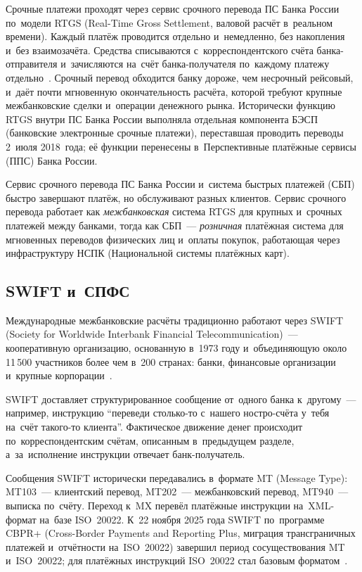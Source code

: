 Срочные платежи проходят через сервис срочного перевода ПС Банка России
по~модели RTGS (Real-Time Gross Settlement, валовой расчёт в~реальном времени).
Каждый платёж проводится отдельно и~немедленно, без накопления и~без
взаимозачёта. Средства списываются с~корреспондентского счёта банка-отправителя
и~зачисляются на~счёт банка-получателя по~каждому платежу
отдельно~\cite{cbr-ps}. Срочный перевод обходится банку дороже, чем несрочный
рейсовый, и~даёт почти мгновенную окончательность расчёта, которой требуют
крупные межбанковские сделки и~операции денежного рынка. Исторически функцию RTGS внутри ПС Банка России выполняла
отдельная компонента БЭСП (банковские электронные срочные платежи), переставшая
проводить переводы 2~июля 2018~года; её функции перенесены в~Перспективные
платёжные сервисы (ППС) Банка России.

Сервис срочного перевода ПС Банка России и~система быстрых платежей (СБП)
быстро завершают платёж, но обслуживают разных клиентов. Сервис срочного
перевода работает как \textit{межбанковская} система RTGS для крупных
и~срочных платежей между банками, тогда как СБП~--- \textit{розничная} платёжная система для
мгновенных переводов физических лиц и~оплаты покупок, работающая через
инфраструктуру НСПК (Национальной системы платёжных карт).

\subsection*{SWIFT и~СПФС}

Международные межбанковские расчёты традиционно работают через SWIFT (Society
for Worldwide Interbank Financial Telecommunication)~--- кооперативную
организацию, основанную в~1973 году и~объединяющую около 11\,500 участников
более чем в~200 странах: банки, финансовые организации и~крупные
корпорации~\cite{swift-overview}.

SWIFT доставляет структурированное сообщение от~одного банка к~другому~---
например, инструкцию \enquote{переведи столько-то с~нашего ностро-счёта у~тебя
на~счёт такого-то клиента}. Фактическое движение денег происходит
по~корреспондентским счётам, описанным в~предыдущем разделе, а~за~исполнение
инструкции отвечает банк-получатель.

Сообщения SWIFT исторически передавались в~формате MT (Message Type): MT103~---
клиентский перевод, MT202~--- межбанковский перевод, MT940~--- выписка по~счёту.
Переход к~MX перевёл платёжные инструкции на~XML-формат на~базе ISO~20022.
К~22 ноября 2025 года SWIFT по~программе CBPR+ (Cross-Border
  Payments and Reporting Plus, миграция трансграничных платежей и~отчётности
на~ISO~20022) завершил период сосуществования MT и~ISO~20022; для платёжных
инструкций ISO~20022 стал базовым
форматом~\cite{swift-iso20022-milestone,swift-iso20022-implementation}.

